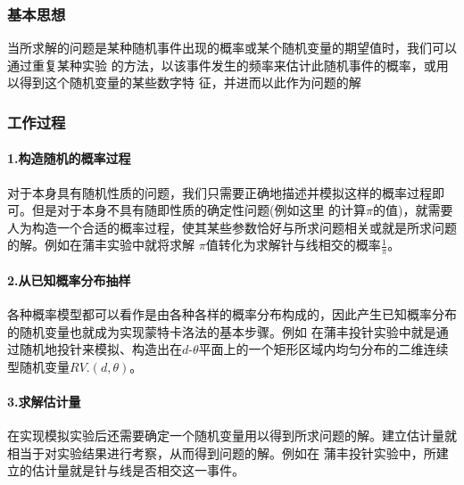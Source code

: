 \documentclass[UTF8]{ctexart}
\begin{document}
    \subsubsection{基本思想}
        当所求解的问题是某种随机事件出现的概率或某个随机变量的期望值时，我们可以通过重复某种实验
        的方法，以该事件发生的频率来估计此随机事件的概率，或用以得到这个随机变量的某些数字特
        征，并进而以此作为问题的解
    \subsubsection{工作过程}
    \paragraph{1.构造随机的概率过程}
        对于本身具有随机性质的问题，我们只需要正确地描述并模拟这样的概率过程即可。但是对于本身不具有随即性质的确定性问题(例如这里
    的计算$\pi$的值)，就需要人为构造一个合适的概率过程，使其某些参数恰好与所求问题相关或就是所求问题的解。例如在蒲丰实验中就将求解
    $\pi$值转化为求解针与线相交的概率$\frac{1}{\pi}$。
    \paragraph{2.从已知概率分布抽样}
        各种概率模型都可以看作是由各种各样的概率分布构成的，因此产生已知概率分布的随机变量也就成为实现蒙特卡洛法的基本步骤。例如
    在蒲丰投针实验中就是通过随机地投针来模拟、构造出在$d\text{-}\theta$平面上的一个矩形区域内均匀分布的二维连续型随机变量$RV.(d,\theta)$。
    \paragraph{3.求解估计量}
        在实现模拟实验后还需要确定一个随机变量用以得到所求问题的解。建立估计量就相当于对实验结果进行考察，从而得到问题的解。例如在
    蒲丰投针实验中，所建立的估计量就是针与线是否相交这一事件。




\end{document}
